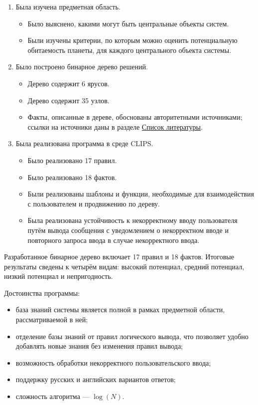\documentclass[14pt,a4paper]{extarticle}
\begin{document}
\begin{enumerate}
  \item Была изучена предметная область.
  \begin{itemize}
    \item Было выяснено, какими могут быть центральные объекты систем.
    \item Были изучены критерии, по которым можно оценить потенциальную обитаемость планеты, для каждого центрального объекта системы.
  \end{itemize}
  \item Было построено бинарное дерево решений.
  \begin{itemize}
    \item Дерево содержит 6 ярусов.
    \item Дерево содержит 35 узлов.
    \item Факты, описанные в дереве, обоснованы авторитетными источниками; ссылки на источники даны в разделе \hyperref[lit]{Список литературы}.
  \end{itemize}
  \item Была реализована программа в среде CLIPS.
  \begin{itemize}
    \item Было реализовано 17 правил.
    \item Было реализовано 18 фактов.
    \item Были реализованы шаблоны и функции, необходимые для взаимодействия с пользователем и продвижению по дереву.
    \item Была реализована устойчивость к некорректному вводу пользователя путём вывода сообщения с уведомлением о некорректном вводе и повторного запроса ввода в случае некорректного ввода.
  \end{itemize}
\end{enumerate}

Разработанное бинарное дерево включает 17 правил и 18 фактов. Итоговые результаты сведены к четырём видам: высокий потенциал, средний потенциал, низкий потенциал и непригодность.

Достоинства программы:

\begin{itemize}
    \item база знаний системы является полной в рамках предметной области, рассматриваемой в ней;
    \item отделение базы знаний от правил логического вывода, что позволяет удобно добавлять новые знания без изменения правил вывода;
    \item возможность обработки некорректного пользовательского ввода;
    \item поддержку русских и английских вариантов ответов;
    \item сложность алгоритма --- $\log(N)$.
\end{itemize}
\end{document}

